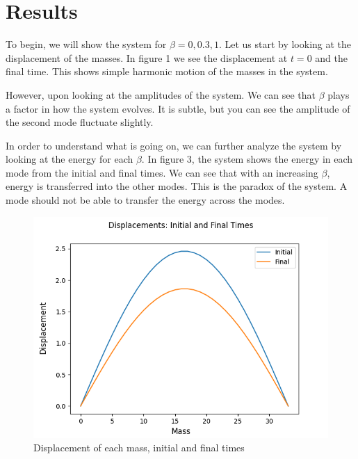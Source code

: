 \documentclass[pra,twocolumn,showpacs,amsmath,amssymb]{revtex4-2}
\begin{document}
\section{Results} \label{sec:results}

To begin, we will show the system for $\beta = 0, 0.3, 1$.
Let us start by looking at the displacement of the masses. In figure 1 we see the displacement at $t = 0$ and the final time. This shows simple harmonic motion of the masses in the system.
\par However, upon looking at the amplitudes of the system. We can see that $\beta$ plays a factor in how the system evolves. It is subtle, but you can see the amplitude of the second mode fluctuate slightly.
\par In order to understand what is going on, we can further analyze the system by looking at the energy for each $\beta$. In figure 3, the system shows the energy in each mode from the initial and final times. We can see that with an increasing $\beta$, energy is transferred into the other modes. This is the paradox of the system. A mode should not be able to transfer the energy across the modes.


\begin{figure}[t!]
\includegraphics[scale=0.50]{Disp_Beta0.png}
\caption{Displacement of each mass, initial and final times}\label{Poincare1}
\end{figure}
\end{document}
